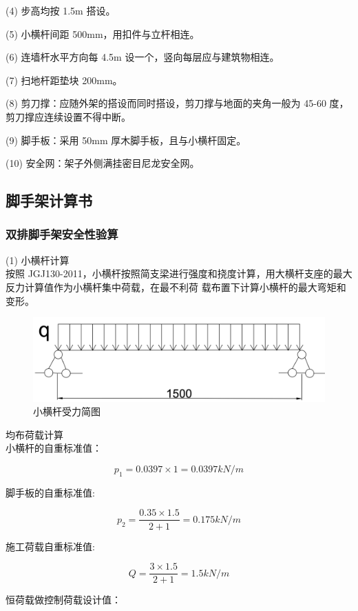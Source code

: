 (4) 步高均按 1.5m 搭设。

(5) 小横杆间距 500mm，用扣件与立杆相连。

(6) 连墙杆水平方向每 4.5m 设一个，竖向每层应与建筑物相连。

(7) 扫地杆距垫块 200mm。

(8) 剪刀撑：应随外架的搭设而同时搭设，剪刀撑与地面的夹角一般为 45-60 度，
剪刀撑应连续设置不得中断。

(9) 脚手板：采用 50mm 厚木脚手板，且与小横杆固定。

(10) 安全网：架子外侧满挂密目尼龙安全网。

\subsection{脚手架计算书}
\subsubsection{双排脚手架安全性验算}

(1) 小横杆计算\\

按照 JGJ130-2011，小横杆按照简支梁进行强度和挠度计算，用大横杆支座的最大反力计算值作为小横杆集中荷载，在最不利荷
载布置下计算小横杆的最大弯矩和变形。\\

    \begin{figure}[thbp!]
        \centering
        \includegraphics[width=0.8\linewidth]{figure/c4f1.png}
        \caption{小横杆受力简图}
        \label{fig:c4f1}
    \end{figure}

 均布荷载计算\\

小横杆的自重标准值：

$$p_1=0.0397 \times 1=0.0397 kN/m$$

脚手板的自重标准值:

$$p_2=\frac{0.35 \times 1.5}{2+1}=0.175 kN/m$$

施工荷载自重标准值:

$$Q=\frac{3 \times 1.5}{2+1}=1.5 kN/m$$

恒荷载做控制荷载设计值：

